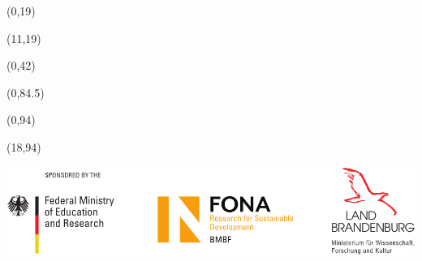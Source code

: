 \documentclass[20pt]{beamer}
\begin{document}
    \begin{frame}

        \begin{textblock}{10.5}(0,19)
            
        \end{textblock}

        \begin{textblock}{19}(11,19)
            
        \end{textblock}

        \begin{textblock}{30}(0,42)
            
        \end{textblock}

        \begin{textblock}{30}(0,84.5)
            
        \end{textblock}

        \begin{textblock}{17}(0,94)
            \begin{WhiteBox}
                \vspace{-1cm}
                \begin{block}{}
                    
                    
                \end{block}
            \end{WhiteBox}
        \end{textblock}

        \begin{textblock}{12}(18,94)
            \begin{WhiteBox}
                \vspace{-1cm}
                \begin{block}{}
                    \includegraphics[width=\textwidth]{img/Sponsor_logos}
                \end{block}
            \end{WhiteBox}
        \end{textblock}
    \end{frame}
\end{document}
